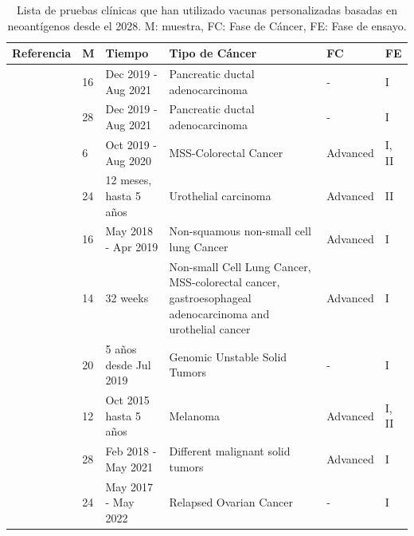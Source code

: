 \begin{table}[h]
	\caption{Lista de pruebas clínicas que han utilizado vacunas personalizadas basadas en neoantígenos desde el 2028. M: muestra, FC: Fase de Cáncer, FE: Fase de ensayo. }
	\label{tab:review_clinics}
	\centering
	\setlength{\tabcolsep}{0.5em} %
	{\renewcommand{\arraystretch}{1.5}%
		{\scriptsize
			\begin{tabular}{p{2.8cm}p{0.5cm}p{2.3cm}p{4.5cm}p{1.5cm}p{0.5cm}}
				\textbf{Referencia} & \textbf{M} & \textbf{Tiempo} & \textbf{Tipo de Cáncer} & \textbf{FC} & \textbf{FE} \\ \midrule
				
				\cite{personalizedVaccinemRNA2023} & 16  & Dec 2019 - Aug 2021 & Pancreatic ductal adenocarcinoma &- & I \\ 
				
				
				
				\cite{rojas2023personalized} & 28  & Dec 2019 - Aug 2021 & Pancreatic ductal adenocarcinoma & -& I \\
				
				\cite{yu2023preliminary} & 6  & Oct 2019 - Aug 2020 & MSS-Colorectal Cancer & Advanced & I, II \\
				
				\cite{holm2022neoantigen} & 24  & 12 meses, hasta 5 años  & Urothelial carcinoma & Advanced & II \\
				
				\cite{awad2022personalized} & 16  &  May 2018 - Apr 2019 & Non-squamous non-small cell lung Cancer & Advanced & I \\
				
				\cite{palmer2022individualized} & 14  & 32 weeks & Non-small Cell Lung Cancer, MSS-colorectal cancer, gastroesophageal adenocarcinoma and urothelial cancer & Advanced & I \\
				
				\cite{wang2022therapy} & 20  & 5 años desde Jul 2019 & Genomic Unstable Solid Tumors &- & I \\
				
				\cite{ellingsen2022characterization} & 12  & Oct 2015 hasta 5 años & Melanoma & Advanced & I, II \\
				
				\cite{shou2022combination} & 28  & Feb 2018 - May  2021 & Different malignant solid tumors & Advanced & I \\
				
				\cite{rocconi2022proof} & 24   &  May  2017 - May  2022 & Relapsed Ovarian Cancer & -& I\\
				

\end{tabular}}}
\end{table}
